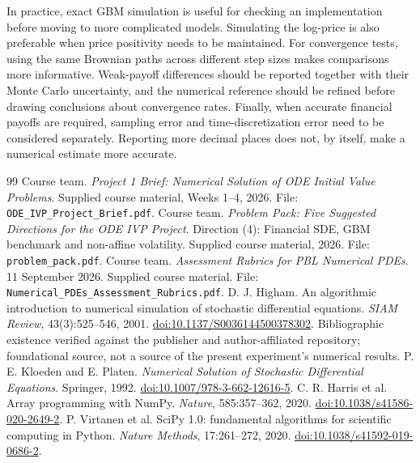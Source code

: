 In practice, exact GBM simulation is useful for checking an implementation before moving to more complicated models. Simulating the log-price is also preferable when price positivity needs to be maintained. For convergence tests, using the same Brownian paths across different step sizes makes comparisons more informative. Weak-payoff differences should be reported together with their Monte Carlo uncertainty, and the numerical reference should be refined before drawing conclusions about convergence rates. Finally, when accurate financial payoffs are required, sampling error and time-discretization error need to be considered separately. Reporting more decimal places does not, by itself, make a numerical estimate more accurate.

\begin{thebibliography}{99}
 Course team. \emph{Project 1 Brief: Numerical Solution of ODE Initial Value Problems}. Supplied course material, Weeks 1--4, 2026. File: \texttt{ODE\_IVP\_Project\_Brief.pdf}.
 Course team. \emph{Problem Pack: Five Suggested Directions for the ODE IVP Project}. Direction (4): Financial SDE, GBM benchmark and non-affine volatility. Supplied course material, 2026. File: \texttt{problem\_pack.pdf}.
 Course team. \emph{Assessment Rubrics for PBL Numerical PDEs}. 11 September 2026. Supplied course material. File: \texttt{Numerical\_PDEs\_Assessment\_Rubrics.pdf}.
 D. J. Higham. An algorithmic introduction to numerical simulation of stochastic differential equations. \emph{SIAM Review}, 43(3):525--546, 2001. \href{https://doi.org/10.1137/S0036144500378302}{doi:10.1137/S0036144500378302}. Bibliographic existence verified against the publisher and author-affiliated repository; foundational source, not a source of the present experiment's numerical results.
 P. E. Kloeden and E. Platen. \emph{Numerical Solution of Stochastic Differential Equations}. Springer, 1992. \href{https://doi.org/10.1007/978-3-662-12616-5}{doi:10.1007/978-3-662-12616-5}.
 C. R. Harris et al. Array programming with NumPy. \emph{Nature}, 585:357--362, 2020. \href{https://doi.org/10.1038/s41586-020-2649-2}{doi:10.1038/s41586-020-2649-2}.
 P. Virtanen et al. SciPy 1.0: fundamental algorithms for scientific computing in Python. \emph{Nature Methods}, 17:261--272, 2020. \href{https://doi.org/10.1038/s41592-019-0686-2}{doi:10.1038/s41592-019-0686-2}.
\end{thebibliography}
\clearpage\appendix

